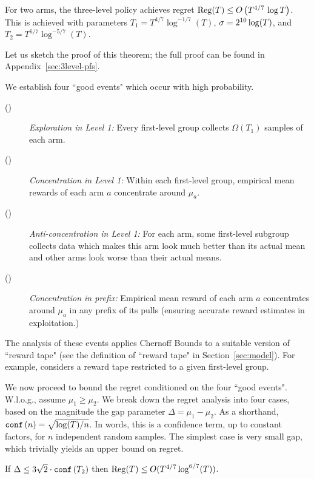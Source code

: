 \begin{theorem}
\label{thm:3level}
For two arms, the three-level policy
achieves regret
$ \mathrm{Reg}(T) \leq O\left( T^{4/7}\, \log T \right)$.
This is achieved with parameters
    $T_1 = T^{4/7}\log^{-1/7}(T)$,
    $\sigma = 2^{10}\log(T)$, and
    $T_2 = T^{6/7}\log^{-5/7}(T)$.
\end{theorem}

Let us sketch the proof of this theorem; the full proof can be found in Appendix~\ref{sec:3level-pfs}.

We establish four ``good events" which occur with high probability.
\begin{description}
\item[()] \emph{Exploration in Level 1:} Every first-level group collects  $\Omega(T_1)$ samples of each arm.
\item[()] \emph{Concentration in Level 1:} Within each first-level group, empirical mean rewards of each arm $a$ concentrate around $\mu_a$.
\item[()] \emph{Anti-concentration in Level 1:} For each arm, some first-level subgroup collects data which makes this arm look much better than its actual mean and other arms look worse than their actual means.
\item[()] \emph{Concentration in prefix:}
Empirical mean reward of each arm $a$ concentrates around $\mu_a$ in any prefix of its pulls (ensuring accurate reward estimates in exploitation.)
\end{description}

The analysis of these events applies Chernoff Bounds to a suitable version of ``reward tape" (see the definition of ``reward tape" in Section~\ref{sec:model}). For example,  considers a reward tape restricted to a given first-level group.

We now proceed to bound the regret conditioned on the four ``good events". W.l.o.g., assume $\mu_1 \geq \mu_2$. We break down the regret analysis into four cases, based on the magnitude the gap parameter $\Delta = \mu_1-\mu_2$. As a shorthand, 
    $\mathtt{conf}\left(n\right) = \sqrt{\log(T)/n}$.
In words, this is a confidence term, up to constant factors, for $n$ independent random samples.
The simplest case is very small gap, which trivially yields an upper bound on regret.

\begin{claim}
If
    $\Delta \leq 3\sqrt{2}\cdot  \mathtt{conf}\left(T_2\right)$
then
  $\mathrm{Reg}(T)\leq O(T^{4/7} \log^{6/7}(T))$.
\end{claim}

